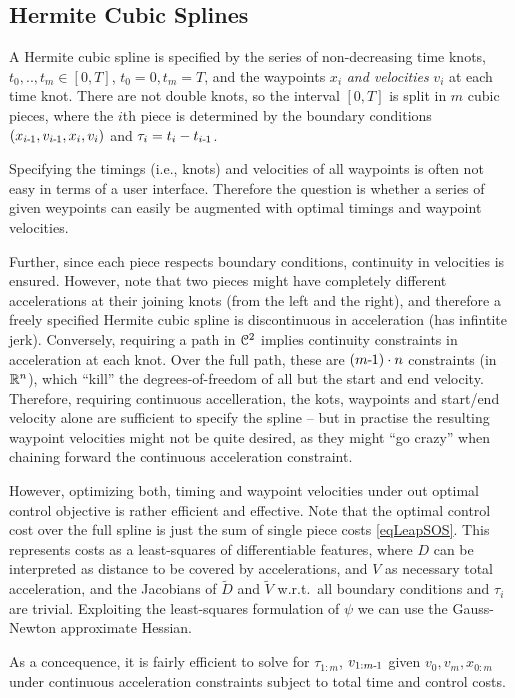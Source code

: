 \subsection{Hermite Cubic Splines}

A Hermite cubic spline is specified by the series of non-decreasing
time knots, $t_0,..,t_m \in [0,T]$, $t_0=0, t_m=T$, and the waypoints
$x_i$ \emph{and velocities} $v_i$ at each time knot. There are not
double knots, so the interval $[0,T]$ is split in $m$ cubic pieces,
where the $i$th piece is determined by the boundary conditions
$(x_{i{{\hspace*{-.0pt}\text{\rm -}\hspace*{-.5pt}}1}},v_{i{{\hspace*{-.0pt}\text{\rm -}\hspace*{-.5pt}}1}}, x_i, v_i)$ and $\tau_i = t_i - t_{i{{\hspace*{-.0pt}\text{\rm -}\hspace*{-.5pt}}1}}$.

Specifying the timings (i.e., knots) and velocities of all waypoints is often not easy in terms of a user interface. Therefore the question is whether a series of given weypoints can easily be augmented with optimal timings and waypoint velocities.

Further, since each piece respects boundary conditions, continuity in velocities is ensured. However, note that two pieces might have completely different
accelerations at their joining knots (from the left and the right), and therefore a freely specified Hermite cubic spline is discontinuous in acceleration (has infintite jerk). Conversely, requiring a path in  ${\cal C}^2$ implies continuity constraints in acceleration at each knot. Over the full path, these are $(m{{\hspace*{-.0pt}\text{\rm -}\hspace*{-.5pt}}1}) \cdot n$ constraints (in ${\mathbb{R}}^n$), which ``kill'' the degrees-of-freedom of all but the start and end velocity. Therefore, requiring continuous accelleration, the kots, waypoints and start/end velocity alone are sufficient to specify the spline -- but in practise the resulting waypoint velocities might not be quite desired, as they might ``go crazy'' when chaining forward the continuous acceleration constraint.

However, optimizing both, timing and waypoint velocities under out
optimal control objective is rather efficient and effective. Note that
the optimal control cost over the full spline is just the sum of
single piece costs \eqref{eqLeapSOS}. This represents costs as a
least-squares of differentiable features, where $D$ can be interpreted
as distance to be covered by accelerations, and $V$ as necessary total
acceleration, and the Jacobians of $\tilde D$ and $\tilde V$
w.r.t.\ all boundary conditions and $\tau_i$ are trivial. Exploiting
the least-squares formulation of $\psi$ we can use the Gauss-Newton
approximate Hessian.

As a concequence, it is fairly efficient to solve for $\tau_{1:m}$, $v_{1:m{{\hspace*{-.0pt}\text{\rm -}\hspace*{-.5pt}}1}}$ given $v_0, v_m, x_{0:m}$ under continuous acceleration constraints subject to total time and control costs.

